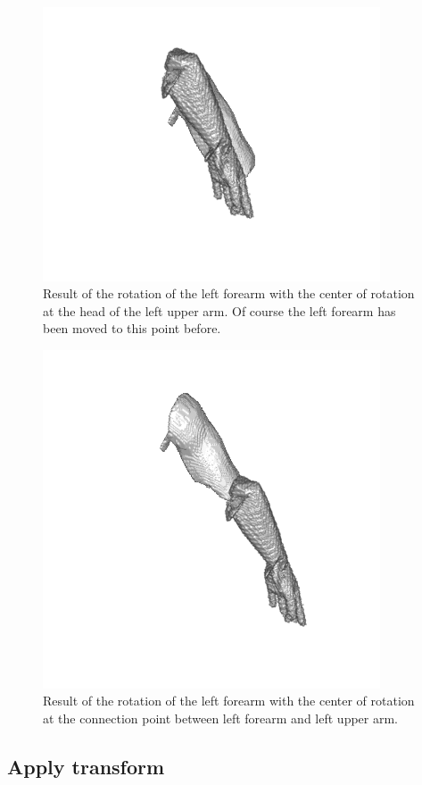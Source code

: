 \begin{figure} [!htb]
    \centering
	\includegraphics[width=10cm]{content/images/leftArmOrRotation.png}
	\caption{Result of the rotation of the left forearm with the center of rotation at the head of the left upper arm. Of course the left forearm has been moved to this point before.} 
	\label{fig:leftArmOrRotation}
\end{figure}
\begin{figure} [!htb]
    \centering
	\includegraphics[width=10cm]{content/images/leftArmRRotation.png}
	\caption{Result of the rotation of the left forearm with the center of rotation at the connection point between left forearm and left upper arm.} 
	\label{fig:leftArmRRotation}
\end{figure}

\newpage
\subsection{Apply transform}

